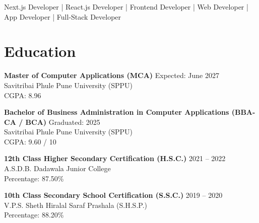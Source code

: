 \documentclass[a4paper,10pt]{article}
\begin{document}
    Next.js Developer | React.js Developer | Frontend Developer | Web Developer | App Developer | Full-Stack Developer

    \section*{Education}

    \textbf{Master of Computer Applications (MCA)} \hfill Expected: June 2027\\
    Savitribai Phule Pune University (SPPU)\\
    CGPA: 8.96 

    \vspace{4pt} 

    \textbf{Bachelor of Business Administration in Computer Applications (BBA-CA / BCA)} \hfill Graduated: 2025\\
    Savitribai Phule Pune University (SPPU)\\
    CGPA: 9.60 / 10

    \vspace{4pt} 

    \textbf{12th Class Higher Secondary Certification (H.S.C.)} \hfill 2021 -- 2022\\
    A.S.D.B. Dadawala Junior College\\
    Percentage: 87.50\%

    \vspace{4pt} 

    \textbf{10th Class Secondary School Certification (S.S.C.)} \hfill 2019 -- 2020\\
    V.P.S. Sheth Hiralal Saraf Prashala (S.H.S.P.)\\
    Percentage: 88.20\%

    
\end{document}

